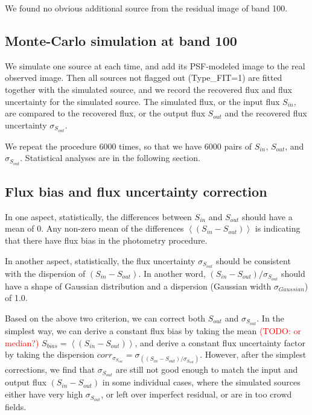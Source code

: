 \documentclass[11pt,a4paper]{article}
\begin{document}
We found no obvious additional source from the residual image of band 100. 

\subsection{Monte-Carlo simulation at band 100}
\label{Band100_Galsim}

We simulate one source at each time, and add its PSF-modeled image to the real observed image. Then all sources not flagged out (Type\_FIT=1) are fitted together with the simulated source, and we record the recovered flux and flux uncertainty for the simulated source. The simulated flux, or the input flux $S_{in}$, are compared to the recovered flux, or the output flux $S_{out}$ and the recovered flux uncertainty $\sigma_{S_{out}}$. 

We repeat the procedure 6000 times, so that we have 6000 pairs of $S_{in}$, $S_{out}$, and $\sigma_{S_{out}}$. Statistical analyses are in the following section. 


\subsection{Flux bias and flux uncertainty correction}
\label{Band100_dfcorr}

In one aspect, statistically, the differences between $S_{in}$ and $S_{out}$ should have a mean of 0. Any non-zero mean of the differences $\left<(S_{in}-S_{out})\right>$ is indicating that there have flux bias in the photometry procedure. 

In another aspect, statistically, the flux uncertainty $\sigma_{S_{out}}$ should be consistent with the dispersion of $(S_{in}-S_{out})$. In another word, $(S_{in}-S_{out})/\sigma_{S_{out}}$ should have a shape of Gaussian distribution and a dispersion (Gaussian width $\sigma_{Gaussian}$) of 1.0. 

Based on the above two criterion, we can correct both $S_{out}$ and $\sigma_{S_{out}}$. In the simplest way, we can derive a constant flux bias by taking the mean \textcolor{red}{(TODO: or median?)} $S_{bias}=\left<(S_{in}-S_{out})\right>$, and derive a constant flux uncertainty factor by taking the dispersion ${corr}_{\sigma_{S_{out}}}=\sigma_{\left((S_{in}-S_{out})/\sigma_{S_{out}}\right)}$. However, after the simplest corrections, we find that $\sigma_{S_{out}}$ are still not good enough to match the input and output flux $(S_{in}-S_{out})$ in some individual cases, where the simulated sources either have very high $\sigma_{S_{out}}$, or left over imperfect residual, or are in too crowd fields. 
\end{document}
